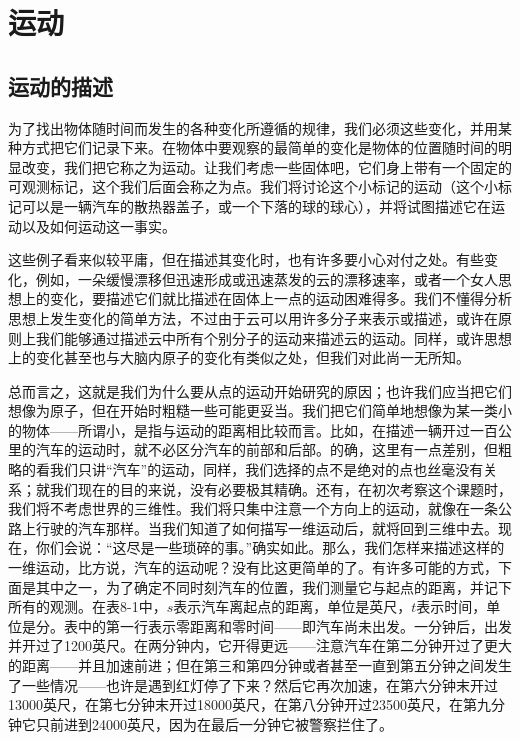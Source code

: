 \documentclass[12pt,oneside]{book}
\begin{document}
\chapter{运动}
\section{运动的描述}
为了找出物体随时间而发生的各种变化所遵循的规律，我们必须这些变化，并用某种方式把它们记录下来。在物体中要观察的最简单的变化是物体的位置随时间的明显改变，我们把它称之为运动。让我们考虑一些固体吧，它们身上带有一个固定的可观测标记，这个我们后面会称之为点。我们将讨论这个小标记的运动（这个小标记可以是一辆汽车的散热器盖子，或一个下落的球的球心），并将试图描述它在运动以及如何运动这一事实。

这些例子看来似较平庸，但在描述其变化时，也有许多要小心对付之处。有些变化，例如，一朵缓慢漂移但迅速形成或迅速蒸发的云的漂移速率，或者一个女人思想上的变化，要描述它们就比描述在固体上一点的运动困难得多。我们不懂得分析思想上发生变化的简单方法，不过由于云可以用许多分子来表示或描述，或许在原则上我们能够通过描述云中所有个别分子的运动来描述云的运动。同样，或许思想上的变化甚至也与大脑内原子的变化有类似之处，但我们对此尚一无所知。

总而言之，这就是我们为什么要从点的运动开始研究的原因；也许我们应当把它们想像为原子，但在开始时粗糙一些可能更妥当。我们把它们简单地想像为某一类小的物体——所谓小，是指与运动的距离相比较而言。比如，在描述一辆开过一百公里的汽车的运动时，就不必区分汽车的前部和后部。的确，这里有一点差别，但粗略的看我们只讲“汽车”的运动，同样，我们选择的点不是绝对的点也丝毫没有关系；就我们现在的目的来说，没有必要极其精确。还有，在初次考察这个课题时，我们将不考虑世界的三维性。我们将只集中注意一个方向上的运动，就像在一条公路上行驶的汽车那样。当我们知道了如何描写一维运动后，就将回到三维中去。现在，你们会说：“这尽是一些琐碎的事。”确实如此。那么，我们怎样来描述这样的一维运动，比方说，汽车的运动呢？没有比这更简单的了。有许多可能的方式，下面是其中之一，为了确定不同时刻汽车的位置，我们测量它与起点的距离，并记下所有的观测。在表8-1中，$s$表示汽车离起点的距离，单位是英尺，$t$表示时间，单位是分。表中的第一行表示零距离和零时间——即汽车尚未出发。一分钟后，出发并开过了1200英尺。在两分钟内，它开得更远——注意汽车在第二分钟开过了更大的距离——并且加速前进；但在第三和第四分钟或者甚至一直到第五分钟之间发生了一些情况——也许是遇到红灯停了下来？然后它再次加速，在第六分钟末开过13000英尺，在第七分钟末开过18000英尺，在第八分钟开过23500英尺，在第九分钟它只前进到24000英尺，因为在最后一分钟它被警察拦住了。
\end{document}
